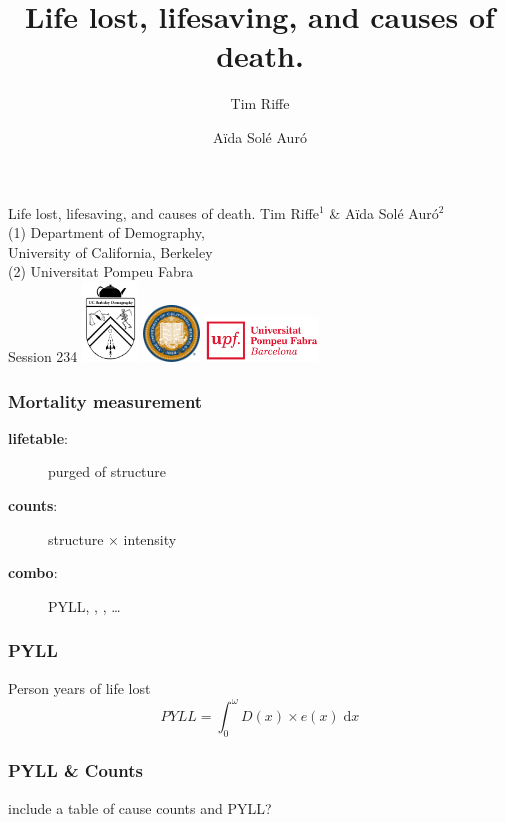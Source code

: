\documentclass{beamer}
\title[Years Lost]{Life lost, lifesaving, and causes of death.}
\author[Riffe \& Sol\'{e}]
{
Tim Riffe \inst{1} \and A{\"i}da Sol\'{e} Aur\'{o} \inst{2}}
\institute %
{
  \inst{1}%
  Department of Demography, \\
  University of California, Berkeley \\
  \and
  \inst{2} Universitat Pompeu Fabra
}
\newcommand{\dd}{\; \mathrm{d}}
\begin{document}
\begin{frame}[plain]

\vspace{3em}
\LARGE Life lost, lifesaving, and causes of death.
\vspace{1em}
\normalsize Tim Riffe$^1$ \& A{\"i}da Sol\'{e} Aur\'{o}$^2$\\

 \small{(1)} Department of Demography, \\
  University of California, Berkeley \\
  \small{(2)} Universitat Pompeu Fabra\\
  \vspace{5 mm}
  Session 234 
  \vspace{10 mm}
  \includegraphics[width=1.5cm]{Figures/demogcrest}\hspace{1cm}
  \includegraphics[width=1.5cm]{Figures/ucbseal1}\hspace{1cm}
  \includegraphics[height=1.2cm]{Figures/UPFcmyk}
\end{frame}


\begin{frame}
\frametitle{Mortality measurement}
\begin{description}
\item[\textbf{lifetable}:] purged of structure
\item[\textbf{counts}:] structure $\times$ intensity
\item[\textbf{combo}:] PYLL, \underline{\hspace{1cm}}, \underline{\hspace{1cm}},
\ldots
\end{description}

\end{frame}

\begin{frame}
\frametitle{PYLL}
Person years of life lost
\begin{equation}
PYLL = \int_0^\omega D(x) \times e(x) \dd x
\end{equation}
\end{frame}


\begin{frame}
\frametitle{PYLL \& Counts}
include a table of cause counts and PYLL?
\end{frame}

\begin{frame}

\end{frame}
\begin{frame}

\end{frame}
\end{document}
